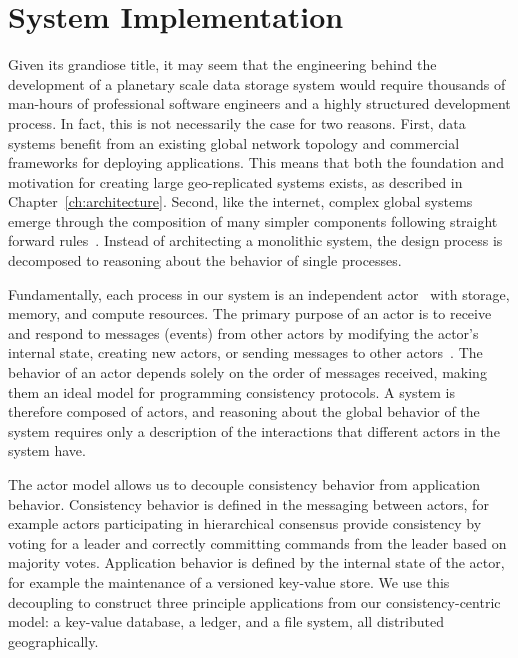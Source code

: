 
\renewcommand{\thechapter}{5}

\chapter{System Implementation}
\label{ch:system_implementation}

Given its grandiose title, it may seem that the engineering behind the development of a planetary scale data storage system would require thousands of man-hours of professional software engineers and a highly structured development process.
In fact, this is not necessarily the case for two reasons.
First, data systems benefit from an existing global network topology and commercial frameworks for deploying applications.
This means that both the foundation and motivation for creating large geo-replicated systems exists, as described in Chapter~\ref{ch:architecture}.
Second, like the internet, complex global systems emerge through the composition of many simpler components following straight forward rules~\cite{internet}.
Instead of architecting a monolithic system, the design process is decomposed to reasoning about the behavior of single processes.

Fundamentally, each process in our system is an independent actor~\cite{actors,scala_actors,orleans} with storage, memory, and compute resources.
The primary purpose of an actor is to receive and respond to messages (events) from other actors by modifying the actor's internal state, creating new actors, or sending messages to other actors~\cite{hewitt_actors}.
The behavior of an actor depends solely on the order of messages received, making them an ideal model for programming consistency protocols.
A system is therefore composed of actors, and reasoning about the global behavior of the system requires only a description of the interactions that different actors in the system have.

The actor model allows us to decouple consistency behavior from application behavior.
Consistency behavior is defined in the messaging between actors, for example actors participating in hierarchical consensus provide consistency by voting for a leader and correctly committing commands from the leader based on majority votes.
Application behavior is defined by the internal state of the actor, for example the maintenance of a versioned key-value store.
We use this decoupling to construct three principle applications from our consistency-centric model: a key-value database, a ledger, and a file system, all distributed geographically.

